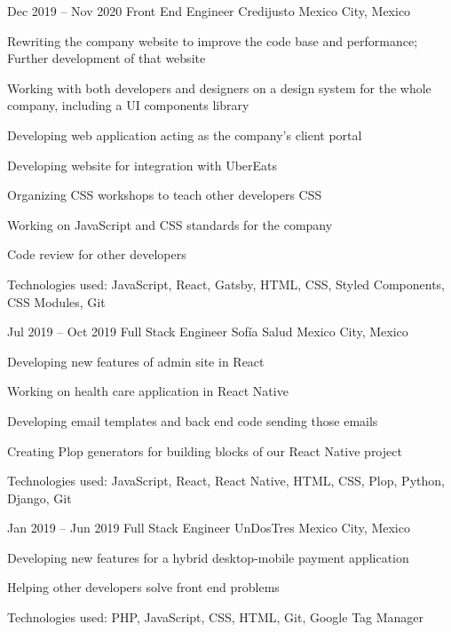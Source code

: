 \begin{sectionlist}
    \sectionlistitemjob
        {Dec 2019 -- Nov 2020}
        {Front End Engineer}
        {Credijusto}
        {Mexico City, Mexico}
        {
            \begin{joblisting}
                \item Rewriting the company website to improve the code base and
                    performance; Further development of that website
                \item Working with both developers and designers on a design
                    system for the whole company, including a UI components
                    library
                \item Developing web application acting as the company's client
                    portal
                \item Developing website for integration with UberEats
                \item Organizing CSS workshops to teach other developers CSS
                \item Working on JavaScript and CSS standards for the company
                \item Code review for other developers
                \item Technologies used: JavaScript, React, Gatsby, HTML, CSS,
                    Styled Components, CSS Modules, Git
            \end{joblisting}
        }

    \sectionlistitemjob
        {Jul 2019 -- Oct 2019}
        {Full Stack Engineer}
        {Sofía Salud}
        {Mexico City, Mexico}
        {
            \begin{joblisting}
                \item Developing new features of admin site in React
                \item Working on health care application in React Native
                \item Developing email templates and back end code sending those emails
                \item Creating Plop generators for building blocks of our React
                    Native project
                \item Technologies used: JavaScript, React, React Native,
                    HTML, CSS, Plop, Python, Django, Git
            \end{joblisting}
        }

    \sectionlistitemjob
        {Jan 2019 -- Jun 2019}
        {Full Stack Engineer}
        {UnDosTres}
        {Mexico City, Mexico}
        {
            \begin{joblisting}
                \item Developing new features for a hybrid desktop-mobile
                    payment application
                \item Helping other developers solve front end problems
                \item Technologies used: PHP, JavaScript, CSS, HTML, Git,
                    Google Tag Manager
            \end{joblisting}
        }


\end{sectionlist}
